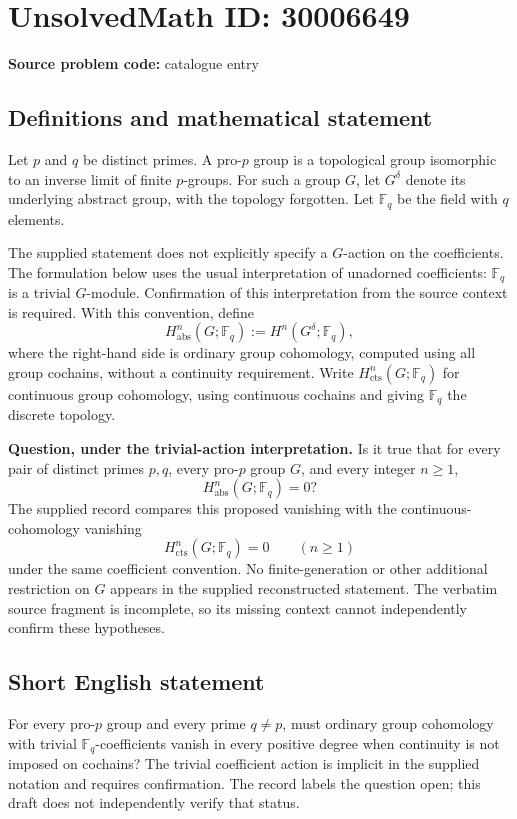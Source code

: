 \documentclass[11pt]{article}
\newcommand{\F}{\mathbb{F}}
\begin{document}
\section*{UnsolvedMath ID: 30006649}
\textbf{Source problem code:} catalogue entry
\subsection{Definitions and mathematical statement}
Let \(p\) and \(q\) be distinct primes. A pro-\(p\) group is a topological group isomorphic to an inverse limit of finite \(p\)-groups. For such a group \(G\), let \(G^{\delta}\) denote its underlying abstract group, with the topology forgotten. Let \(\F_q\) be the field with \(q\) elements.

The supplied statement does not explicitly specify a \(G\)-action on the coefficients. The formulation below uses the usual interpretation of unadorned coefficients: \(\F_q\) is a trivial \(G\)-module. Confirmation of this interpretation from the source context is required. With this convention, define
\[
H^n_{\mathrm{abs}}(G;\F_q):=H^n(G^{\delta};\F_q),
\]
where the right-hand side is ordinary group cohomology, computed using all group cochains, without a continuity requirement. Write \(H^n_{\mathrm{cts}}(G;\F_q)\) for continuous group cohomology, using continuous cochains and giving \(\F_q\) the discrete topology.

\textbf{Question, under the trivial-action interpretation.} Is it true that for every pair of distinct primes \(p,q\), every pro-\(p\) group \(G\), and every integer \(n\geq 1\),
\[
H^n_{\mathrm{abs}}(G;\F_q)=0?
\]
The supplied record compares this proposed vanishing with the continuous-cohomology vanishing
\[
H^n_{\mathrm{cts}}(G;\F_q)=0\qquad(n\geq 1)
\]
under the same coefficient convention. No finite-generation or other additional restriction on \(G\) appears in the supplied reconstructed statement. The verbatim source fragment is incomplete, so its missing context cannot independently confirm these hypotheses.
\subsection{Short English statement}
For every pro-\(p\) group and every prime \(q\neq p\), must ordinary group cohomology with trivial \(\F_q\)-coefficients vanish in every positive degree when continuity is not imposed on cochains? The trivial coefficient action is implicit in the supplied notation and requires confirmation. The record labels the question open; this draft does not independently verify that status.
\end{document}
